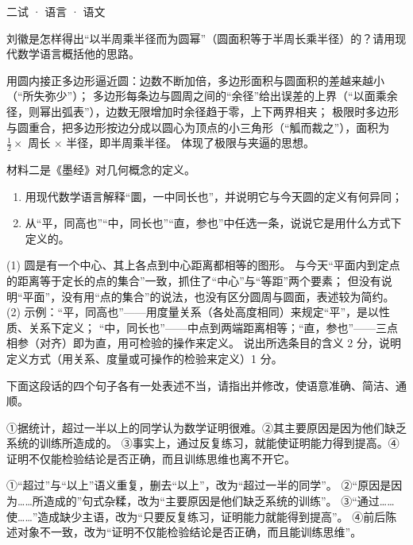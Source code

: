 \documentclass[cjk=noto, seal=first]{mojing-exam}
\begin{document}
\begin{paper}[time={建议 2 小时（训练设置）}, full=100]{二试 · 语言 · 语文}
\begin{questions}
\question[4] 刘徽是怎样得出“以半周乘半径而为圆幂”（圆面积等于半周长乘半径）的？请用现代数学语言概括他的思路。
\answerspace{3cm}
\begin{solution}
用圆内接正多边形逼近圆：边数不断加倍，多边形面积与圆面积的差越来越小（“所失弥少”）；
多边形每条边与圆周之间的“余径”给出误差的上界（“以面乘余径，则幂出弧表”），边数无限增加时余径趋于零，上下两界相夹；
极限时多边形与圆重合，把多边形按边分成以圆心为顶点的小三角形（“觚而裁之”），面积为 $\frac12\times$ 周长 $\times$ 半径，即半周乘半径。
体现了极限与夹逼的思想。
\end{solution}

\question[6] 材料二是《墨经》对几何概念的定义。
\begin{enumerate}
  \item 用现代数学语言解释“圜，一中同长也”，并说明它与今天圆的定义有何异同；
  \item 从“平，同高也”“中，同长也”“直，参也”中任选一条，说说它是用什么方式下定义的。
\end{enumerate}
\answerspace{3cm}
\begin{solution}
(1) 圆是有一个中心、其上各点到中心距离都相等的图形。
与今天“平面内到定点的距离等于定长的点的集合”一致，抓住了“中心”与“等距”两个要素；
但没有说明“平面”，没有用“点的集合”的说法，也没有区分圆周与圆面，表述较为简约。
(2) 示例：“平，同高也”——用度量关系（各处高度相同）来规定“平”，是以性质、关系下定义；
“中，同长也”——中点到两端距离相等；“直，参也”——三点相参（对齐）即为直，用可检验的操作来定义。
说出所选条目的含义 2 分，说明定义方式（用关系、度量或可操作的检验来定义）1 分。
\end{solution}
\end{questions}


\begin{questions}
\question[10] 下面这段话的四个句子各有一处表述不当，请指出并修改，使语意准确、简洁、通顺。

{\kaishu ①据统计，超过一半以上的同学认为数学证明很难。②其主要原因是因为他们缺乏系统的训练所造成的。
③事实上，通过反复练习，就能使证明能力得到提高。④证明不仅能检验结论是否正确，而且训练思维也离不开它。\par}
\answerspace{3cm}
\begin{solution}
①“超过”与“以上”语义重复，删去“以上”，改为“超过一半的同学”。
②“原因是因为……所造成的”句式杂糅，改为“主要原因是他们缺乏系统的训练”。
③“通过……使……”造成缺少主语，改为“只要反复练习，证明能力就能得到提高”。
④前后陈述对象不一致，改为“证明不仅能检验结论是否正确，而且能训练思维”。
\end{solution}
\end{questions}


\end{paper}
\end{document}
